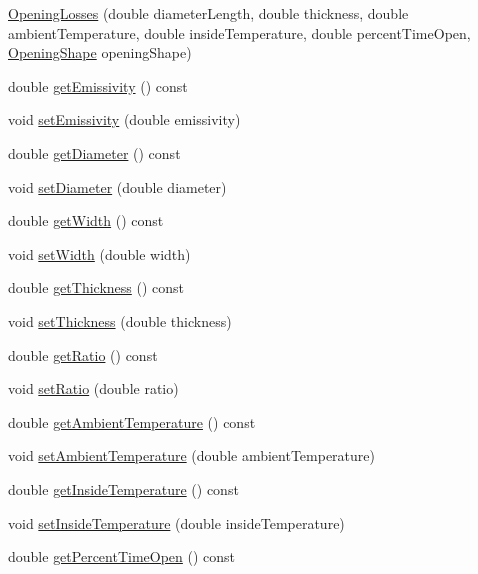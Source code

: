 \begin{DoxyCompactItemize}
\item 
\hyperlink{class_opening_losses_a93adcb54a21a2bcb796e0e4946360a3a}{Opening\+Losses} (double diameter\+Length, double thickness, double ambient\+Temperature, double inside\+Temperature, double percent\+Time\+Open, \hyperlink{class_opening_losses_a57f9759b6fd72a1b75aa885800e26157}{Opening\+Shape} opening\+Shape)
\item 
double \hyperlink{class_opening_losses_a7eaf8e68f268e8ff1671c5f9f0462b4f}{get\+Emissivity} () const
\item 
void \hyperlink{class_opening_losses_aa63eb1c2ba9057d401f3a7f5dd974afe}{set\+Emissivity} (double emissivity)
\item 
double \hyperlink{class_opening_losses_a8ed643300b0f5b606be6cd669cd413c3}{get\+Diameter} () const
\item 
void \hyperlink{class_opening_losses_ab840ba51788e83c0b1dc9b8c05b1eadb}{set\+Diameter} (double diameter)
\item 
double \hyperlink{class_opening_losses_a0374aeac5532188358b5f6ad0f120305}{get\+Width} () const
\item 
void \hyperlink{class_opening_losses_a5ee8c514917c16ecd2c63caecc98e1c6}{set\+Width} (double width)
\item 
double \hyperlink{class_opening_losses_aeefdf4431056de65ca84c6dfb24b61e1}{get\+Thickness} () const
\item 
void \hyperlink{class_opening_losses_a221cc88072e4f0975f15c6cd96781dea}{set\+Thickness} (double thickness)
\item 
double \hyperlink{class_opening_losses_ac9f7dbd2cc023932b5d8076a21a3f690}{get\+Ratio} () const
\item 
void \hyperlink{class_opening_losses_aab7f82f24511c37f0bc4b29cbc7239b5}{set\+Ratio} (double ratio)
\item 
double \hyperlink{class_opening_losses_a198f46508744d6943846ea95a9513a45}{get\+Ambient\+Temperature} () const
\item 
void \hyperlink{class_opening_losses_a3624c9fad2a413871b7324f7e957a5ae}{set\+Ambient\+Temperature} (double ambient\+Temperature)
\item 
double \hyperlink{class_opening_losses_abe930dab77b1c855503ee51fdf66c88a}{get\+Inside\+Temperature} () const
\item 
void \hyperlink{class_opening_losses_a895dcaa81bbb3dc823ec903480f05262}{set\+Inside\+Temperature} (double inside\+Temperature)
\item 
double \hyperlink{class_opening_losses_aeefc3790a569008ff2e804033a9efea3}{get\+Percent\+Time\+Open} () const

\end{DoxyCompactItemize}
